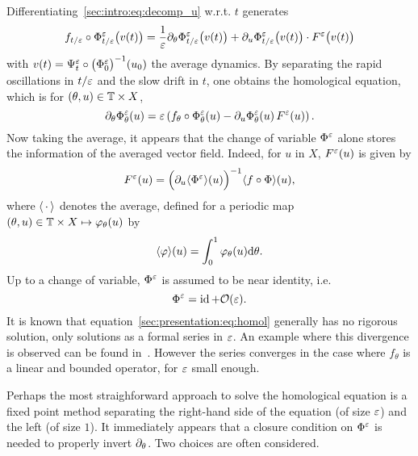 Differentiating~\eqref{sec:intro:eq:decomp_u} w.r.t. \( t \) generates
\begin{equation*}
  f_{t/\varepsilon} \circ \Phi^{\varepsilon}_{t/\varepsilon} \big( v(t) \big) 
  = \frac{1}{\varepsilon} \partial_\theta \Phi^{\varepsilon}_{t/\varepsilon} \big( v(t) \big)
  + \partial_u \Phi^{\varepsilon}_{t/\varepsilon}\big( v(t) \big) \cdot F^{\varepsilon} \big( v(t) \big)
\end{equation*}
with \( v(t) = \Psi^{\varepsilon}_t \circ \big( \Phi^{\varepsilon}_0 \big)^{-1} (u_0) \) the
average dynamics. By separating the rapid oscillations in $t/\varepsilon$ and the
slow drift in $t$, one obtains the homological equation, which is for
$(\theta, u) \in \mathbb{T} \times X$, 
\begin{equation} \label{sec:presentation:eq:homol}
  \partial_\theta \Phi^{\varepsilon}_{\theta} (u)
  = \varepsilon \left( f_{\theta} \circ \Phi^{\varepsilon}_{\theta} (u) 
    - \partial_u \Phi^{\varepsilon}_{\theta} (u) \, F^{\varepsilon} (u) \right) .
\end{equation}
Now taking the average, it appears that the change of variable $\Phi^{\varepsilon}$
alone stores the information of the averaged vector field. Indeed, for $u$
in $X$, $F^{\varepsilon}(u)$ is given by
\begin{equation}
  F^{\varepsilon} (u) = \Big( \partial_u \langle \Phi^{\varepsilon} \rangle (u) \Big)^{-1} 
        \langle f \circ \Phi \rangle (u) ,
\end{equation}
where $\langle \,\cdot\, \rangle$ denotes the average, defined for a periodic map
$ (\theta, u) \in \mathbb{T} \times X \mapsto \varphi_\theta(u)$ by
\begin{equation}
  \langle \varphi \rangle (u) = \int_0^1 \varphi_\theta (u) \mathrm{d} \theta .
\end{equation}
Up to a change of variable, $\Phi^{\varepsilon}$ is assumed to be near identity,
i.e. 
\begin{equation}
  \Phi^{\varepsilon} = \operatorname{id} + \mathcal{O}(\varepsilon) .
\end{equation}
It is known that equation~\eqref{sec:presentation:eq:homol} generally has no
rigorous solution, only solutions as a formal series in $\varepsilon$. An example
where this divergence is observed can be found
in~\cite{chartier.2010.higher}. However the series converges in the
case where $f_\theta$ is a linear and bounded operator, for $\varepsilon$ small
enough. 

\bigskip
Perhaps the most straighforward approach to solve the homological equation
is a fixed point method separating the right-hand side of the equation (of
size $\varepsilon$) and the left (of size $1$). It immediately appears that a
closure condition on $\Phi^{\varepsilon}$ is needed to properly invert
$\partial_\theta$. Two choices are often considered.

